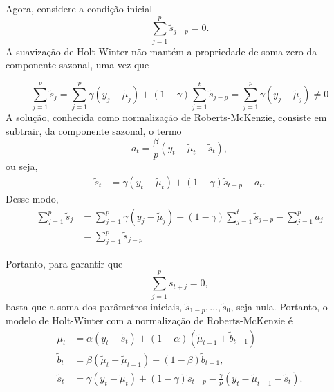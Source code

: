 \documentclass[
  letterpaper,
  DIV=11,
  numbers=noendperiod]{scrartcl}
\theoremstyle{definition}
\theoremstyle{definition}
\theoremstyle{plain}
\theoremstyle{plain}
\theoremstyle{remark}
\begin{document}
Agora, considere a condição inicial \[\sum_{j=1}^p \tilde{s}_{j-p}=0.\]
A suavização de Holt-Winter não mantém a propriedade de soma zero da
componente sazonal, uma vez que

\[\sum_{j=1}^p \tilde{s}_{j}=\sum_{j=1}^p\gamma(y_j-\tilde{\mu}_j)+(1-\gamma)\sum_{j=1}^t\tilde{s}_{j-p}=\sum_{j=1}^p\gamma(y_j-\tilde{\mu}_j)\neq 0\]
A solução, conhecida como normalização de Roberts-McKenzie, consiste em
subtrair, da componente sazonal, o termo
\[a_t=\frac{\beta}{p}(y_t-\tilde{\mu}_t-\tilde{s}_t),\] ou seja,
\begin{align}\tilde{s}_t &= \gamma (y_t - \tilde{\mu}_t) + (1-\gamma) \tilde{s}_{t-p}-a_t.
\end{align} Desse modo,
\begin{align}\sum_{j=1}^p \tilde{s}_{j}&=\sum_{j=1}^p\gamma(y_j-\tilde{\mu}_j)+(1-\gamma)\sum_{j=1}^t\tilde{s}_{j-p}-\sum_{j=1}^p a_j\\&=\sum_{j=1}^p\tilde{s}_{j-p}\end{align}

Portanto, para garantir que \[\sum_{j=1}^p s_{t+j}=0,\] basta que a soma
dos parâmetros iniciais, \(\tilde{s}_{1-p},\ldots,\tilde{s}_0\), seja
nula. Portanto, o modelo de Holt-Winter com a normalização de
Roberts-McKenzie é \begin{align*}
    \tilde{\mu}_t &=\alpha (y_t - \tilde{s}_t) + (1-\alpha) (\tilde{\mu}_{t-1}+ \tilde{b}_{t-1}) \\
        \tilde{b}_t &= \beta (\tilde{\mu}_t - \tilde{\mu}_{t-1}) + (1-\beta) \tilde{b}_{t-1}
,\\
    \tilde{s}_t &= \gamma (y_t - \tilde{\mu}_t) + (1-\gamma) \tilde{s}_{t-p}-\frac{\gamma}{p}(y_t-\tilde{\mu}_{t-1}-\tilde{s}_{t}).
    \end{align*}
\end{document}
